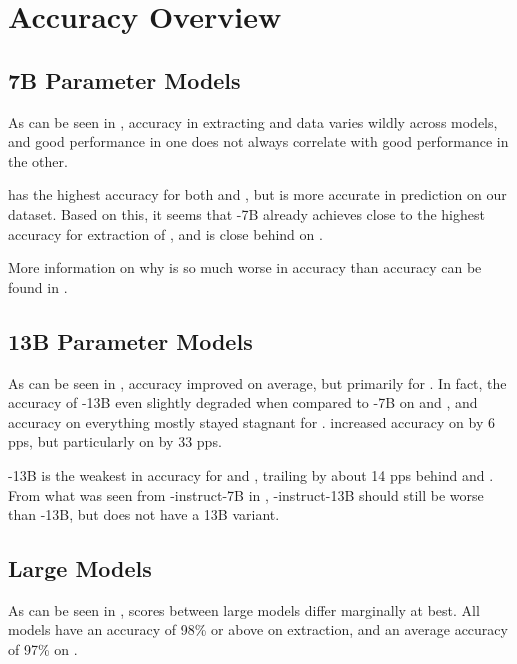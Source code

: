





\section{Accuracy Overview}\label{sec:result:first}

\subsection{7B Parameter Models}\label{sub:result:7b}
As can be seen in , accuracy in extracting \ttemp and \ttime data varies wildly across models, and good performance in one does not always correlate with good performance in the other.

 has the highest accuracy for both \ttemp and \ttime, but  is more accurate in \tsolv prediction on our dataset.
Based on this, it seems that -7B already achieves close to the highest accuracy for extraction of \ttemp, and is close behind on \ttime.

More information on why  is so much worse in \ttime accuracy than \ttemp accuracy can be found in .


\subsection{13B Parameter Models}\label{sub:result:13b}

As can be seen in , accuracy improved on average, but primarily for .
In fact, the accuracy of -13B even slightly degraded when compared to -7B on \ttemp and \ttime, and accuracy on everything mostly stayed stagnant for .
 increased accuracy on \ttemp by 6 \glspl{pp}, but particularly on \ttime by 33 \glspl{pp}.

-13B is the weakest in accuracy for \ttemp and \ttime, trailing by about 14 \glspl{pp} behind  and .
From what was seen from -instruct-7B in , -instruct-13B should still be worse than -13B, but  does not have a 13B variant.

\subsection{Large Models}\label{sub:result:large}
As can be seen in , scores between large models differ marginally at best.
All models have an accuracy of 98\% or above on \ttemp extraction, and an average accuracy of 97\% on \ttime.

